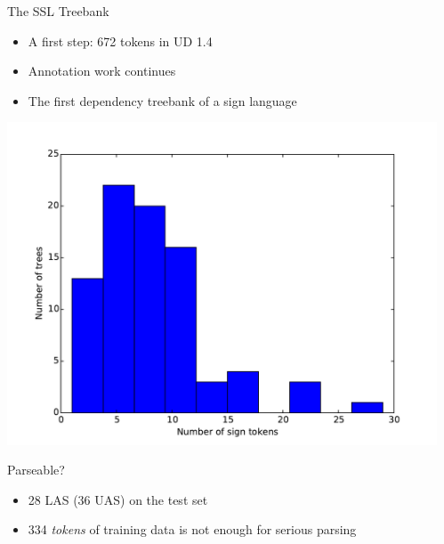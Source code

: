 \documentclass[final]{beamer}
\begin{document}
\begin{frame}{}
\begin{columns}[t]
\begin{column}{.48\linewidth}
        \end{column}

        \begin{column}{.48\linewidth}

            \begin{block}{\large The SSL Treebank}
                \begin{itemize}
                    \item A first step: 672 tokens in UD 1.4
                    \item Annotation work continues
                    \item The first dependency treebank of a sign language
                \end{itemize}
            \end{block}

           \begin{center}
            \includegraphics[width=1.0\linewidth]{../nodalida2017/treesizes.pdf}
           \end{center}

            \begin{block}{\large Parseable?}
                \begin{itemize}
                    \item 28 LAS (36 UAS) on the test set
                    \item 334 \emph{tokens} of training data is not enough for
                        serious parsing
                \end{itemize}
            \end{block}


\end{column}
\end{columns}
\end{frame}
\end{document}
